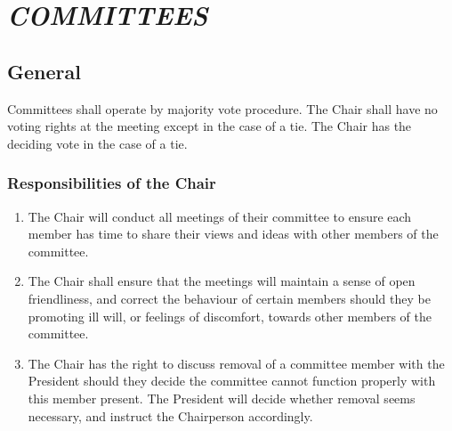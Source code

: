 


% 

\hypertarget{committees}{%
 \section{\texorpdfstring{\emph{COMMITTEES}}{COMMITTEES}}
 \label{committees}}

\hypertarget{general}{%
 \subsection{General}
 \label{general}}
Committees shall operate by majority vote procedure. The Chair shall
have no voting rights at the meeting except in the case of a tie. The
Chair has the deciding vote in the case of a tie.

\hypertarget{responsibilities-of-the-chair}{%
 \subsubsection{Responsibilities of the
  Chair}
 \label{responsibilities-of-the-chair}}

\begin{enumerate}
 \item
  The Chair will conduct all meetings of their committee to ensure each
  member has time to share their views and ideas with other members of
  the committee.
 \item
  The Chair shall ensure that the meetings will maintain a sense of open
  friendliness, and correct the behaviour of certain members should they
  be promoting ill will, or feelings of discomfort, towards other
  members of the committee.
 \item
  The Chair has the right to discuss removal of a committee member with
  the President should they decide the committee cannot function
  properly with this member present. The President will decide whether
  removal seems necessary, and instruct the Chairperson accordingly.
\end{enumerate}

